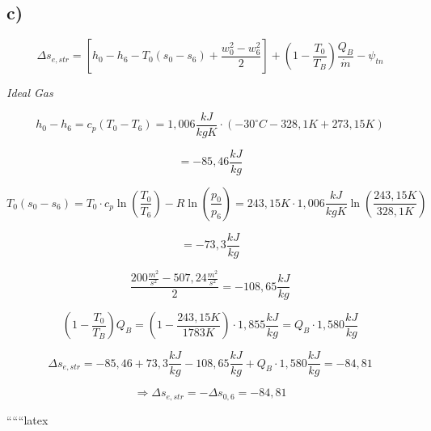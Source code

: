 

\subsection*{c)}

\[
\Delta s_{e, str} = \left[ h_0 - h_6 - T_0 (s_0 - s_6) + \frac{w_0^2 - w_6^2}{2} \right] + \left( 1 - \frac{T_0}{T_B} \right) \frac{Q_B}{\dot{m}} - \psi_{tn}
\]

\textit{Ideal Gas}

\[
h_0 - h_6 = c_p (T_0 - T_6) = 1,006 \frac{kJ}{kgK} \cdot (-30^\circ C - 328,1K + 273,15K)
\]

\[
= -85,46 \frac{kJ}{kg}
\]

\[
T_0 (s_0 - s_6) = T_0 \cdot c_p \ln \left( \frac{T_0}{T_6} \right) - R \ln \left( \frac{p_0}{p_6} \right) = 243,15K \cdot 1,006 \frac{kJ}{kgK} \ln \left( \frac{243,15K}{328,1K} \right)
\]

\[
= -73,3 \frac{kJ}{kg}
\]

\[
\frac{200 \frac{m^2}{s^2} - 507,24 \frac{m^2}{s^2}}{2} = -108,65 \frac{kJ}{kg}
\]

\[
\left( 1 - \frac{T_0}{T_B} \right) Q_B = \left( 1 - \frac{243,15K}{1783K} \right) \cdot 1,855 \frac{kJ}{kg} = Q_B \cdot 1,580 \frac{kJ}{kg}
\]

\[
\Delta s_{e, str} = -85,46 + 73,3 \frac{kJ}{kg} - 108,65 \frac{kJ}{kg} + Q_B \cdot 1,580 \frac{kJ}{kg} = -84,81
\]

\[
\Rightarrow \Delta s_{e, str} = -\Delta s_{0,6} = -84,81
\]

``````latex